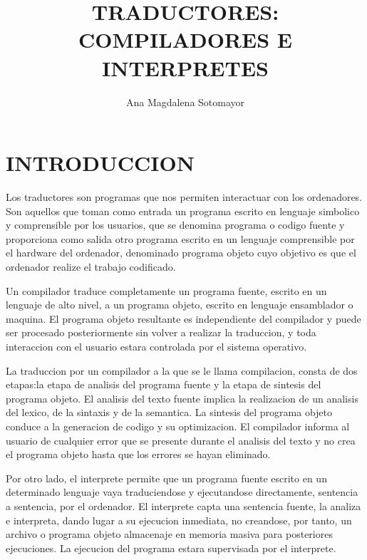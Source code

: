 \documentclass[10pt]{article}
\begin{document}
 
\title{TRADUCTORES: COMPILADORES E INTERPRETES} 
\author{Ana Magdalena Sotomayor} 

\maketitle 
\section{INTRODUCCION}
Los traductores son programas que nos permiten interactuar con los ordenadores. Son aquellos que  toman como entrada un programa escrito en lenguaje simbolico y comprensible por los usuarios, que se denomina programa o codigo fuente y proporciona como salida otro programa escrito en un lenguaje comprensible por el hardware del ordenador, denominado programa objeto cuyo objetivo es que el ordenador realize el trabajo codificado.

Un compilador traduce completamente un programa fuente, escrito en un lenguaje de alto nivel, a un programa objeto, escrito en lenguaje ensamblador o maquina. El programa objeto resultante es independiente del compilador y puede ser procesado posteriormente sin volver a realizar la traduccion, y toda interaccion con el usuario estara controlada por el sistema operativo. 

La traduccion por un compilador a la que se le llama compilacion, consta de dos etapas:la etapa de analisis del programa fuente y la etapa de sintesis del programa objeto. El analisis del texto fuente implica la realizacion de un analisis del lexico, de la sintaxis y de la semantica. La sintesis del programa objeto conduce a la generacion de codigo y su optimizacion. El compilador informa al usuario de cualquier error que se presente durante el analisis del texto y no crea el programa objeto hasta que los errores se hayan eliminado.

Por otro lado, el interprete permite que un programa fuente escrito en un determinado lenguaje vaya traduciendose y ejecutandose directamente, sentencia a sentencia, por el ordenador. El interprete capta una sentencia fuente, la analiza e interpreta, dando lugar a su ejecucion inmediata, no creandose, por tanto, un archivo o programa objeto almacenaje en memoria masiva para posteriores ejecuciones. La ejecucion del programa estara supervisada por el interprete.
\end{document}
